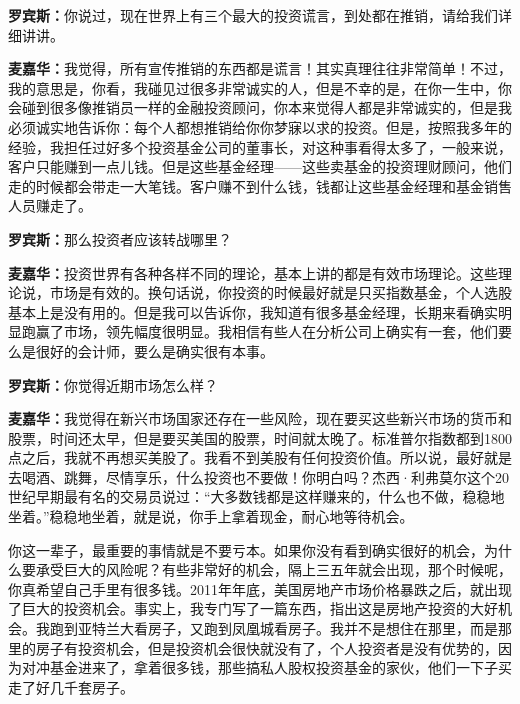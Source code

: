\begin{BookQuote}
\textbf{罗宾斯：}你说过，现在世界上有三个最大的投资谎言，到处都在推销，请给我们详细讲讲。
\end{BookQuote}

\begin{BookQuote}
\textbf{麦嘉华：}我觉得，所有宣传推销的东西都是谎言！其实真理往往非常简单！不过，我的意思是，你看，我碰见过很多非常诚实的人，但是不幸的是，在你一生中，你会碰到很多像推销员一样的金融投资顾问，你本来觉得人都是非常诚实的，但是我必须诚实地告诉你：每个人都想推销给你你梦寐以求的投资。但是，按照我多年的经验，我担任过好多个投资基金公司的董事长，对这种事看得太多了，一般来说，客户只能赚到一点儿钱。但是这些基金经理——这些卖基金的投资理财顾问，他们走的时候都会带走一大笔钱。客户赚不到什么钱，钱都让这些基金经理和基金销售人员赚走了。
\end{BookQuote}

\begin{BookQuote}
\textbf{罗宾斯：}那么投资者应该转战哪里？
\end{BookQuote}

\begin{BookQuote}
\textbf{麦嘉华：}投资世界有各种各样不同的理论，基本上讲的都是有效市场理论。这些理论说，市场是有效的。换句话说，你投资的时候最好就是只买指数基金，个人选股基本上是没有用的。但是我可以告诉你，我知道有很多基金经理，长期来看确实明显跑赢了市场，领先幅度很明显。我相信有些人在分析公司上确实有一套，他们要么是很好的会计师，要么是确实很有本事。
\end{BookQuote}

\begin{BookQuote}
\textbf{罗宾斯：}你觉得近期市场怎么样？
\end{BookQuote}

\begin{BookQuote}
\textbf{麦嘉华：}我觉得在新兴市场国家还存在一些风险，现在要买这些新兴市场的货币和股票，时间还太早，但是要买美国的股票，时间就太晚了。标准普尔指数都到1800点之后，我就不再想买美股了。我看不到美股有任何投资价值。所以说，最好就是去喝酒、跳舞，尽情享乐，什么投资也不要做！你明白吗？杰西·利弗莫尔这个20世纪早期最有名的交易员说过：“大多数钱都是这样赚来的，什么也不做，稳稳地坐着。”稳稳地坐着，就是说，你手上拿着现金，耐心地等待机会。
\end{BookQuote}

你这一辈子，最重要的事情就是不要亏本。如果你没有看到确实很好的机会，为什么要承受巨大的风险呢？有些非常好的机会，隔上三五年就会出现，那个时候呢，你真希望自己手里有很多钱。2011年年底，美国房地产市场价格暴跌之后，就出现了巨大的投资机会。事实上，我专门写了一篇东西，指出这是房地产投资的大好机会。我跑到亚特兰大看房子，又跑到凤凰城看房子。我并不是想住在那里，而是那里的房子有投资机会，但是投资机会很快就没有了，个人投资者是没有优势的，因为对冲基金进来了，拿着很多钱，那些搞私人股权投资基金的家伙，他们一下子买走了好几千套房子。

